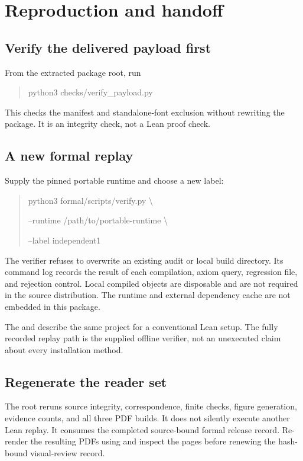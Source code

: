 \documentclass[11pt]{article}
\begin{document}
\clearpage\section{Reproduction and handoff}
\subsection{Verify the delivered payload first}
From the extracted package root, run
\begin{quote}\small\ttfamily
python3 checks/verify\_payload.py
\end{quote}
This checks the manifest and standalone-font exclusion without rewriting the package. It is an integrity check, not a Lean proof check.

\subsection{A new formal replay}
Supply the pinned portable runtime and choose a new label:
\begin{quote}\small\ttfamily
python3 formal/scripts/verify.py \textbackslash\par
\hspace*{1em}--runtime /path/to/portable-runtime \textbackslash\par
\hspace*{1em}--label independent1
\end{quote}
The verifier refuses to overwrite an existing audit or local build directory. Its command log records the result of each compilation, axiom query, regression file, and rejection control. Local compiled objects are disposable and are not required in the source distribution. The runtime and external dependency cache are not embedded in this package.

The  and  describe the same project for a conventional Lean setup. The fully recorded replay path is the supplied offline verifier, not an unexecuted claim about every installation method.

\subsection{Regenerate the reader set}
The root  reruns source integrity, correspondence, finite checks, figure generation, evidence counts, and all three PDF builds. It does not silently execute another Lean replay. It consumes the completed source-bound formal release record. Re-render the resulting PDFs using  and inspect the pages before renewing the hash-bound visual-review record.
\end{document}

